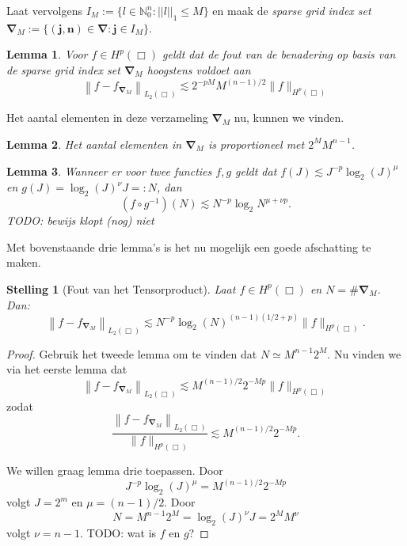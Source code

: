 \documentclass[11pt]{report}
\newcommand{\N}{\mathbb{N}}
\theoremstyle{plain}
\newtheorem*{lemm}{Lemma}
\newtheorem*{stelling}{Stelling}
\theoremstyle{remark}
\begin{document}
Laat vervolgens $I_M := \{ l \in \N^n_0: ||l||_1 \leq M \}$ en maak de \emph{sparse grid index set} $\boldsymbol{\nabla}_M := \{ \boldsymbol{(j,n)} \in \boldsymbol{\nabla}: \boldsymbol{j} \in I_M \}$.

\begin{lemm}{\cite[P3.2.3]{tammo}}
  Voor $f \in H^p(\Box)$ geldt dat de fout van de benadering op basis van de sparse grid index set $\boldsymbol{\nabla}_M$ hoogstens voldoet aan
\[
  \left\| f - f_{\boldsymbol\nabla_M} \right\|_{L_2(\Box)} \lesssim 2^{-pM} M^{(n-1)/2} \| f \|_{H^p(\Box)}
\]
\end{lemm}

Het aantal elementen in deze verzameling $\boldsymbol{\nabla}_M$ nu, kunnen we vinden.
\begin{lemm}{\cite[L3.3.1]{tammo}}
  Het aantal elementen in $\boldsymbol{\nabla}_M$ is proportioneel met $2^M M^{n-1}$.
\end{lemm}

\begin{lemm}
  Wanneer er voor twee functies $f, g$ geldt dat $f(J) \lesssim J^{-p}\log_2(J)^\mu$ en $g(J) = \log_2(J)^\nu J =: N$, dan
  \[
    (f \circ g^{-1})(N) \lesssim N^{-p} \log_2{N}^{\mu + \nu p}.
  \]
  TODO: bewijs klopt (nog) niet
\end{lemm}

Met bovenstaande drie lemma's is het nu mogelijk een goede afschatting te maken. 
\begin{stelling}[Fout van het Tensorproduct]
  Laat $f \in H^p(\Box)$ en $N = \#\boldsymbol{\nabla}_M$. Dan:
  \[
    \left\| f - f_{\boldsymbol\nabla_M} \right\|_{L_2(\Box)} \lesssim N^{-p} \log_2(N)^{(n-1)(1/2 + p)} \| f \|_{H^p(\Box)}.
  \]
\end{stelling}
\begin{proof}
  Gebruik het tweede lemma om te vinden dat $N \simeq M^{n-1}2^M$. Nu vinden we via het eerste lemma dat
  \[
    \left\| f - f_{\boldsymbol\nabla_M} \right\|_{L_2(\Box)} \lesssim M^{(n-1)/2}2^{-Mp}\| f \|_{H^p(\Box)}
  \]
  zodat
  \[
    \frac{\left\| f - f_{\boldsymbol\nabla_M}  \right\|_{L_2(\Box)}}{\| f \|_{H^p(\Box)}} \lesssim M^{(n-1)/2}2^{-Mp}.
  \]

  We willen graag lemma drie toepassen. Door
  \[
    J^{-p}\log_2(J)^\mu = M^{(n-1)/2} 2^{-Mp}
  \]
  volgt $J = 2^m$ en $\mu = (n-1)/2$. Door
  \[
    N = M^{n-1}2^M = \log_2(J)^\nu J = 2^M M^\nu
  \] volgt $\nu = n-1$. TODO: wat is $f$ en $g$?
\end{proof}
\end{document}
